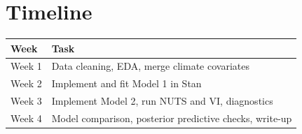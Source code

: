 \documentclass[11pt]{article}
\begin{document}
\section{Timeline}

\begin{center}
\begin{tabular}{ll}
\toprule
\textbf{Week} & \textbf{Task} \\
\midrule
Week 1 & Data cleaning, EDA, merge climate covariates \\
Week 2 & Implement and fit Model 1 in Stan \\
Week 3 & Implement Model 2, run NUTS and VI, diagnostics \\
Week 4 & Model comparison, posterior predictive checks, write-up \\
\bottomrule
\end{tabular}
\end{center}


\end{document}
